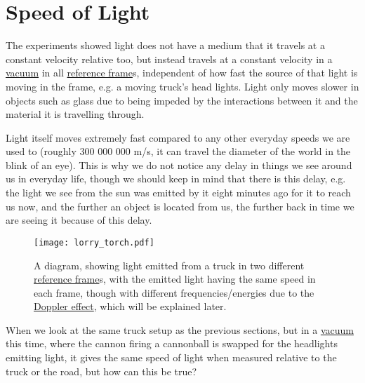 \section{Speed of Light}%

The experiments showed light does not have a medium that it travels at a constant velocity relative too, but instead travels at a constant velocity in a \hyperlink{def-vacuum}{vacuum} in all \hyperlink{def-Reference-frame}{reference frame}s, independent of how fast the source of that light is moving in the frame, e.g. a moving truck's head lights. Light only moves slower in objects such as glass due to being impeded by the interactions between it and the material it is travelling through.

Light itself moves extremely fast compared to any other everyday speeds we are used to (roughly 300 000 000 m/s, it can travel the diameter of the world in the blink of an eye). This is why we do not notice any delay in things we see around us in everyday life, though we should keep in mind that there is this delay, e.g. the light we see from the sun was emitted by it eight minutes ago for it to reach us now, and the further an object is located from us, the further back in time we are seeing it because of this delay.

\begin{figure}[ht]
\centering
       \texttt{[image: lorry\_torch.pdf]}
    \caption{A diagram, showing light emitted from a truck in two different \protect\hyperlink{def-Reference-frame}{reference frame}s, with the emitted light having the same speed in each frame, though with different frequencies/energies due to the \protect\hyperlink{def-doppler-effect}{Doppler effect}, which will be explained later.}
    \label{fig: truck torch}
\end{figure}


When we look at the same truck setup as the previous sections, but in a \hyperlink{def-vacuum}{vacuum} this time, where the cannon firing a cannonball is swapped for the headlights emitting light, it gives the same speed of light when measured relative to the truck or the road, but how can this be true?

